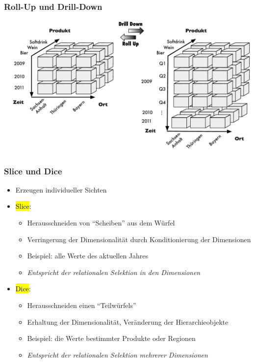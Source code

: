         
        \begin{frame}
        
        \frametitle{Roll-Up und Drill-Down}
        
        \begin{center}
        \includegraphics[scale=.46]{fig6/OLAP-DrillDown.pdf}
        \end{center}
        \end{frame}
        
        
        
        \begin{frame}
        
        \frametitle{Slice und Dice}
        \begin{itemize}
        \item Erzeugen individueller Sichten
        \item \hl{Slice}:
          \begin{itemize}
          \item Herausschneiden von "`Scheiben"' aus dem Würfel
          \item Verringerung der Dimensionalität durch Konditionierung der Dimensionen
          \item Beispiel: alle Werte des aktuellen Jahres
           \item \emph{Entspricht der relationalen Selektion in den Dimensionen}
          \end{itemize}
        \item \hl{Dice}:
          \begin{itemize}
          \item Herausschneiden einen "`Teilwürfels"'
          \item Erhaltung der Dimensionalität, Veränderung der
            Hierarchieobjekte
          \item Beispiel: die Werte bestimmter Produkte oder Regionen
          \item \emph{Entspricht der relationalen Selektion mehrerer Dimensionen}
        \end{itemize}
        \end{itemize}
        
        \end{frame}
        
